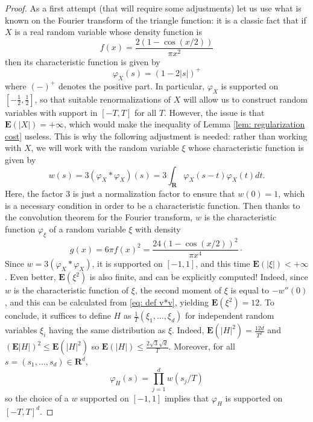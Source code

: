 \documentclass[10pt,a4paper]{amsart}
\newcommand{\Rr}{\mathbf{R}}
\newcommand{\expect}{\mathbf{E}}
\begin{document}
\begin{proof}
  As a first attempt (that will require some adjustments) let us use
  what is known on the Fourier transform of the triangle function: it
  is a classic fact that if $X$ is a real random variable whose
  density function is
  $$
  f(x) = \frac{2(1 - \cos(x/2))}{\pi x^2}
  $$
  then its characteristic function is given by
  $$
  \varphi_X(s) = (1 - 2 |s|)^{+}
  $$
  where $(-)^{+}$ denotes the positive part. In particular,
  $\varphi_X$ is supported on $\left[ -\frac12, \frac12 \right]$, so
  that suitable renormalizations of $X$ will allow us to construct
  random variables with support in $[-T, T]$ for all $T$. However, the
  issue is that $\expect(|X|) = + \infty$, which would make the
  inequality of Lemma \ref{lem: regularization cost} useless. This is
  why the following adjustment is needed: rather than working with
  $X$, we will work with the random variable $\xi$ whose
  characteristic function is given by
  \begin{equation} \label{eq: def v*v}
    w(s) = 3 (\varphi_X * \varphi_X) (s) = 3 \int_{\Rr} \varphi_X(s-t)\varphi_X(t) dt.
  \end{equation}
  Here, the factor $3$ is just a normalization factor to ensure that
  $w(0) = 1$, which is a necessary condition in order to be a
  characteristic function. Then thanks to the convolution theorem for
  the Fourier transform, $w$ is the characteristic function
  $\varphi_\xi$ of a random variable $\xi$ with density
  $$
  g(x) =6 \pi f(x)^2 = \frac{24 (1 - \cos(x/2))^2}{\pi x^4}\cdot
  $$
  Since $w = 3(\varphi_X * \varphi_X)$, it is supported on $[-1,1]$,
  and this time $\expect(|\xi|) < + \infty$. Even better,
  $\expect(\xi^2)$ is also finite, and can be explicitly computed!
  Indeed, since $w$ is the characteristic function of $\xi$, the
  second moment of $\xi$ is equal to $-w''(0)$, and this can be
  calculated from \eqref{eq: def v*v}, yielding $\expect(\xi^2) =
  12$. To conclude, it suffices to define $H$ as
  $\frac{1}{T}(\xi_1, \dots, \xi_d)$ for independent random variables
  $\xi_i$ having the same distribution as $\xi$. Indeed,
  $\expect(|H|^2) = \frac{12d}{T^2}$ and
  $(\expect|H|)^2 \leqslant \expect(|H|^2)$ so
  $\expect(|H|) \leqslant \frac{2 \sqrt{3}\sqrt{d}}{T}$. Moreover, for all
  $s =(s_1, \dots, s_d) \in \Rr^d$,
  $$
  \varphi_H(s) = \prod_{j = 1}^{d} w(s_j / T)
  $$
  so the choice of a $w$ supported on $[-1, 1]$ implies that
  $\varphi_H$ is supported on $[-T,T]^d$.
\end{proof}
\end{document}

